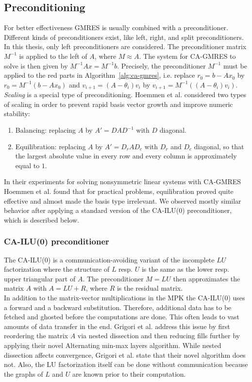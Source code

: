 \documentclass{scrartcl}
\numberwithin{equation}{section}
\begin{document}
\subsection{Preconditioning}
For better effectiveness GMRES is usually combined with a preconditioner. Different kinds of preconditioners exist, like left, right, and split preconditioners. In this thesis, only left preconditioners are considered. The preconditioner matrix $M^{-1}$ is applied to the left of $A$, where $M \approx A$. The system for CA-GMRES to solve is then given by $M^{-1}Ax = M^{-1}b$. Precisely, the preconditioner $M^{-1}$ must be applied to the red parts in Algorithm~\ref{alg:ca-gmres}, i.e. replace $r_0 = b - Ax_0$ by $r_0 = M^{-1}(b - Ax_0)$ and  $v_{i + 1} = (A - \theta_i)v_i$ by $v_{i + 1} = M^{-1}((A - \theta_i)v_i)$.\\

\textit{Scaling} is a special type of preconditioning. Hoemmen et al. \cite{Hoemmen:2010:CKS:1970638} considered two types of scaling in order to prevent rapid basis vector growth and improve numeric stability:
\begin{enumerate}
\item Balancing: replacing $A$ by $A' = DAD^{-1}$ with $D$ diagonal.
\item Equilibration: replacing $A$ by $A' = D_rAD_c$ with $D_r$ and $D_c$ diagonal, so that the largest absolute value in every row and every column is approximately equal to $1$.
\end{enumerate}
In their experiments for solving nonsymmetric linear systems with CA-GMRES Hoemmen et al. \cite{Hoemmen:2010:CKS:1970638} found that for practical problems, equilibration proved quite effective and almost made the basis type irrelevant. We observed mostly similar behavior after applying a standard version of the CA-ILU(0) preconditioner, which is described below.

\subsubsection{CA-ILU(0) preconditioner} \label{sec:ca-ilu}
The CA-ILU(0) is a communication-avoiding variant of the incomplete $LU$ factorization where the structure of $L$ resp. $U$ is the same as the lower resp. upper triangular part of $A$. The preconditioner $M = LU$ then approximates the matrix $A$ with $A = LU + R$, where $R$ is the residual matrix.\\
In addition to the matrix-vector multiplications in the MPK the CA-ILU(0) uses a forward and a backward substitution. Therefore, additional data has to be fetched and ghosted before the computations are done. This often leads to vast amounts of data transfer in the end. Grigori et al. \cite{Grigori} address this issue by first reordering the matrix $A$ via nested dissection and then reducing fills further by applying their novel Alternating min-max layers algorithm. While nested dissection affects convergence, Grigori et al. state that their novel algorithm does not. Also, the LU factorization itself can be done without communication because the graphs of $L$ and $U$ are known prior to their computation. 
\end{document}
